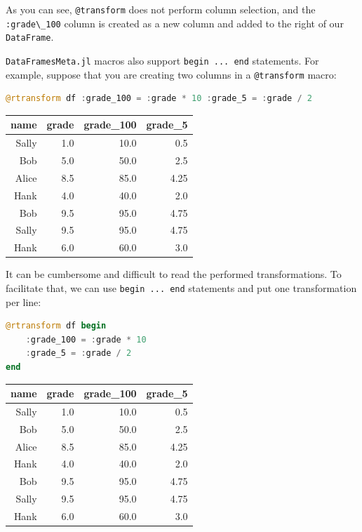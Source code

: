 \documentclass[
  notoc %
]{tufte-book}
\newcommand{\passthrough}[1]{#1}
\begin{document}
As you can see, \passthrough{\lstinline!@transform!} does not perform
column selection, and the \passthrough{\lstinline!:grade\_100!} column
is created as a new column and added to the right of our
\passthrough{\lstinline!DataFrame!}.

\passthrough{\lstinline!DataFramesMeta.jl!} macros also support
\passthrough{\lstinline!begin ... end!} statements. For example, suppose
that you are creating two columns in a
\passthrough{\lstinline!@transform!} macro:

\begin{lstlisting}[language=Julia]
@rtransform df :grade_100 = :grade * 10 :grade_5 = :grade / 2
\end{lstlisting}

\begin{longtable}[]{@{}rrrr@{}}
\toprule
name & grade & grade\_100 & grade\_5 \\
\midrule
\endhead
Sally & 1.0 & 10.0 & 0.5 \\
Bob & 5.0 & 50.0 & 2.5 \\
Alice & 8.5 & 85.0 & 4.25 \\
Hank & 4.0 & 40.0 & 2.0 \\
Bob & 9.5 & 95.0 & 4.75 \\
Sally & 9.5 & 95.0 & 4.75 \\
Hank & 6.0 & 60.0 & 3.0 \\
\bottomrule
\end{longtable}

It can be cumbersome and difficult to read the performed
transformations. To facilitate that, we can use
\passthrough{\lstinline!begin ... end!} statements and put one
transformation per line:

\begin{lstlisting}[language=Julia]
@rtransform df begin
    :grade_100 = :grade * 10
    :grade_5 = :grade / 2
end
\end{lstlisting}

\begin{longtable}[]{@{}rrrr@{}}
\toprule
name & grade & grade\_100 & grade\_5 \\
\midrule
\endhead
Sally & 1.0 & 10.0 & 0.5 \\
Bob & 5.0 & 50.0 & 2.5 \\
Alice & 8.5 & 85.0 & 4.25 \\
Hank & 4.0 & 40.0 & 2.0 \\
Bob & 9.5 & 95.0 & 4.75 \\
Sally & 9.5 & 95.0 & 4.75 \\
Hank & 6.0 & 60.0 & 3.0 \\
\bottomrule
\end{longtable}
\end{document}
